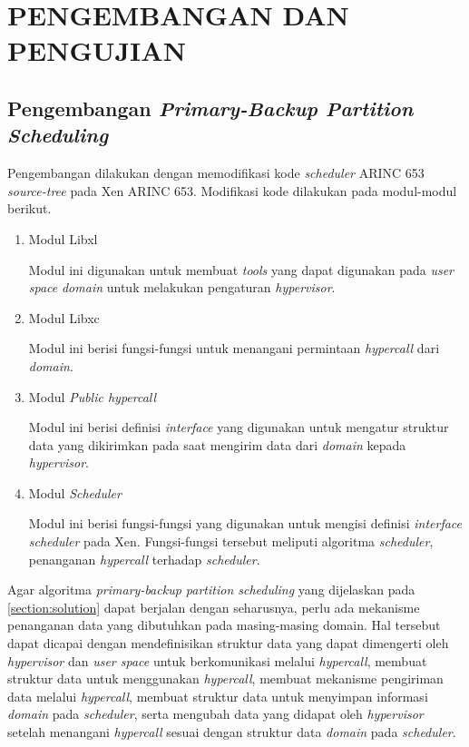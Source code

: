 \chapter{PENGEMBANGAN DAN PENGUJIAN}

\section{Pengembangan \textit{Primary-Backup Partition Scheduling}}

Pengembangan dilakukan dengan memodifikasi kode \textit{scheduler} ARINC 653
\textit{source-tree} pada Xen ARINC 653.  Modifikasi kode dilakukan pada modul-modul berikut.

\begin{enumerate}

	\item Modul Libxl

	Modul ini digunakan untuk membuat \textit{tools} yang dapat digunakan pada \textit{user
	space} \textit{domain}  untuk melakukan pengaturan \textit{hypervisor}.

	\item Modul Libxc

	Modul ini berisi fungsi-fungsi untuk menangani permintaan \textit{hypercall} dari
	\textit{domain}.

	\item Modul \textit{Public hypercall}

	Modul ini berisi definisi \textit{interface} yang digunakan untuk mengatur struktur data
	yang dikirimkan pada saat mengirim data dari \textit{domain} kepada \textit{hypervisor}.

	\item Modul \textit{Scheduler}

	Modul ini berisi fungsi-fungsi yang digunakan untuk mengisi definisi \textit{interface}
	\textit{scheduler} pada Xen. Fungsi-fungsi tersebut meliputi algoritma
	\textit{scheduler}, penanganan \textit{hypercall} terhadap \textit{scheduler}.

\end{enumerate}

Agar algoritma \textit{primary-backup partition scheduling} yang dijelaskan pada
\autoref{section:solution} dapat berjalan dengan seharusnya, perlu ada mekanisme penanganan data
yang dibutuhkan pada masing-masing domain. Hal tersebut dapat dicapai dengan mendefinisikan
struktur data yang dapat dimengerti oleh \textit{hypervisor} dan \textit{user space} untuk
berkomunikasi melalui \textit{hypercall}, membuat struktur data untuk menggunakan
\textit{hypercall}, membuat mekanisme pengiriman data melalui \textit{hypercall}, membuat
struktur data untuk menyimpan informasi \textit{domain} pada \textit{scheduler}, serta mengubah
data yang didapat oleh \textit{hypervisor} setelah menangani \textit{hypercall} sesuai dengan
struktur data \textit{domain} pada \textit{scheduler}.

